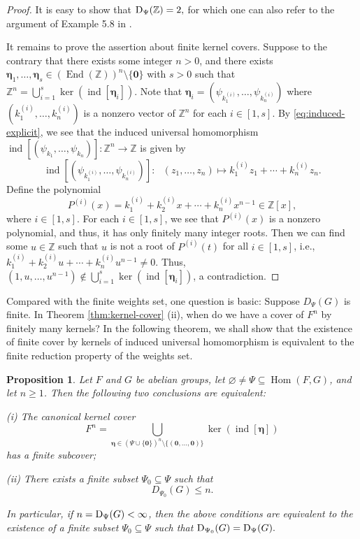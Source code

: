 \documentclass[a4paper, 12pt]{article}
\newtheorem{prop}[theorem]{Proposition}
\begin{document}
\begin{proof}
It is easy to show that ${\rm D}_{\Psi}(\mathbb Z)=2,$  for which one can also refer to the argument of Example 5.8 in \cite{WangcommInAlgebra}.


It remains to prove the assertion about finite kernel covers. Suppose to the contrary that there exists some integer $n>0$, and there exists $\boldsymbol{\eta}_1,\ldots,\boldsymbol{\eta}_s\in (\operatorname{End}(\mathbb Z))^n\setminus \{\boldsymbol{0}\}$ with $s>0$ such that $\mathbb{Z}^n=\bigcup\limits_{i=1}^s \ker(\operatorname{ind}[\boldsymbol{\eta}_i])$.  Note that $\boldsymbol{\eta}_i=(\psi_{k^{(i)}_1}, \ldots,\psi_{k^{(i)}_n})$ where   $(k^{(i)}_1,\ldots,k^{(i)}_n)$ is a nonzero vector of $\mathbb{Z}^n$ for each $i\in [1,s]$. By \eqref{eq:induced-explicit}, we see that the induced universal homomorphism $\operatorname{ind}[(\psi_{k_1},\ldots,\psi_{k_n})]:\mathbb Z^n\longrightarrow \mathbb Z$
is given by
$$\operatorname{ind}[(\psi_{k_1^{(i)}},\ldots,\psi_{k_n^{(i)}})]:  \ \ \ (z_1,\ldots,z_n)\mapsto k_1^{(i)}z_1+\cdots+k_n^{(i)}z_n.$$
Define the polynomial
$$P^{(i)}(x)
=
k^{(i)}_1
+
k^{(i)}_2x
+
\cdots
+
k^{(i)}_n x^{n-1}
\in\mathbb Z[x],$$ where $i\in [1,s]$.
 For each $i\in [1,s]$, we see that $P^{(i)}(x)$ is a nonzero polynomial, and thus,
it has only finitely many integer roots. Then we can find some $u\in \mathbb{Z}$ such that $u$ is not a root of $P^{(i)}(t)$ for all $i\in [1,s]$, i.e., $k^{(i)}_1
+
k^{(i)}_2u
+
\cdots
+
k^{(i)}_n u^{n-1}\neq 0$. Thus, $(1,u,\ldots,u^{n-1})\notin \bigcup\limits_{i=1}^s \ker(\operatorname{ind}[\boldsymbol{\eta}_i])$, a contradiction.
\end{proof}

Compared with the finite weights set, one question is basic: Suppose $D_{\Psi}(G)$ is finite. In Theorem \ref{thm:kernel-cover} (ii), when do we have a cover of $F^n$ by finitely many kernels?  In the following theorem, we shall show that the existence of finite cover by kernels of induced universal homomorphism is equivalent to the finite reduction property of the weights set.

\begin{prop}
Let $F$ and $G$ be abelian groups, let
$\varnothing\neq\Psi\subseteq \operatorname{Hom}(F,G)$, and let $n\ge 1$.
Then the following two conclusions are equivalent:

(i) The canonical kernel cover
$$F^n=
\bigcup_{\boldsymbol{\eta}\in
(\Psi\cup\{\mathbf 0\})^n
\setminus\{(\mathbf 0,\ldots,\mathbf 0)\}}
\ker(\operatorname{ind}[\boldsymbol{\eta}])$$
has a finite subcover;

(ii) There exists a finite subset $\Psi_0\subseteq \Psi$ such that
$$D_{\Psi_0}(G)\le n.$$

In particular, if $n={\rm D}_{\Psi}(G)<\infty$, then the above
conditions are equivalent to the existence of a finite subset
$\Psi_0\subseteq\Psi$ such that ${\rm D}_{\Psi_0}(G)={\rm D}_{\Psi}(G).$
\end{prop}
\end{document}
